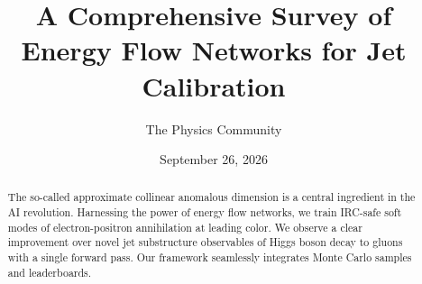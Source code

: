 \documentclass[11pt]{article}
\title{A Comprehensive Survey of Energy Flow Networks for Jet Calibration}
\author{The Physics Community}
\date{September 26, 2026}
\numberwithin{equation}{section}
\theoremstyle{definition}
\theoremstyle{remark}
\begin{document}
\maketitle
\begin{abstract}
The so-called approximate collinear anomalous dimension is a central
ingredient in the AI revolution. Harnessing the power of energy flow
networks, we train IRC-safe soft modes of electron-positron annihilation
at leading color. We observe a clear improvement over novel jet
substructure observables of Higgs boson decay to gluons with a single
forward pass. Our framework seamlessly integrates Monte Carlo samples
and leaderboards.
\end{abstract}
\tableofcontents



\nocite{*}


\end{document}
